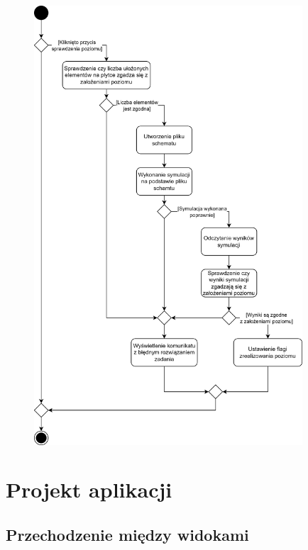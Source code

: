 \documentclass[12pt, a4paper]{article} %
\begin{document}
\begin{figure}[h]
	\centering
	\includegraphics[width=10cm]{images/diagramy_czynnosci/plan-diagram_czynnosci_sprawdzenie_poziomu.png}
	\caption{}
	\label{rys:diagram_czynnosci_sprawdzenie_poziomu}
\end{figure}


\clearpage
\section{Projekt aplikacji}
\subsection{Przechodzenie między widokami}

\end{document}
